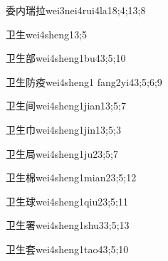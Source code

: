 \begin{verbete}{委内瑞拉}{wei3nei4rui4la1}{8;4;13;8}
\end{verbete}

\begin{verbete}{卫生}{wei4sheng1}{3;5}
\end{verbete}

\begin{verbete}{卫生部}{wei4sheng1bu4}{3;5;10}
\end{verbete}

\begin{verbete}{卫生防疫}{wei4sheng1 fang2yi4}{3;5;6;9}
\end{verbete}

\begin{verbete}{卫生间}{wei4sheng1jian1}{3;5;7}
\end{verbete}

\begin{verbete}{卫生巾}{wei4sheng1jin1}{3;5;3}
\end{verbete}

\begin{verbete}{卫生局}{wei4sheng1ju2}{3;5;7}
\end{verbete}

\begin{verbete}{卫生棉}{wei4sheng1mian2}{3;5;12}
\end{verbete}

\begin{verbete}{卫生球}{wei4sheng1qiu2}{3;5;11}
\end{verbete}

\begin{verbete}{卫生署}{wei4sheng1shu3}{3;5;13}
\end{verbete}

\begin{verbete}{卫生套}{wei4sheng1tao4}{3;5;10}
\end{verbete}

